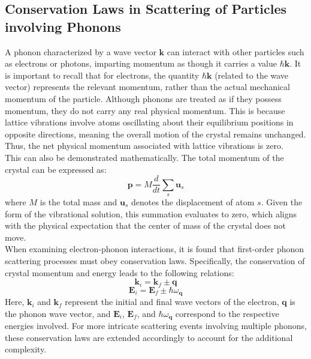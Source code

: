 \subsection{Conservation Laws in Scattering of Particles involving Phonons}
A phonon characterized by a wave vector $\mathbf{k}$ can interact with other particles such as electrons or photons, imparting momentum as though it carries a value $\hbar \mathbf{k}$. It is important to recall that for electrons, the quantity $\hbar \mathbf{k}$ (related to the wave vector) represents the relevant momentum, rather than the actual mechanical momentum of the particle. Although phonons are treated as if they possess momentum, they do not carry any real physical momentum. This is because lattice vibrations involve atoms oscillating about their equilibrium positions in opposite directions, meaning the overall motion of the crystal remains unchanged. Thus, the net physical momentum associated with lattice vibrations is zero.\\
This can also be demonstrated mathematically. The total momentum of the crystal can be expressed as:
\begin{equation}
	\mathbf{p} = M \frac{d}{dt} \sum_s \mathbf{u}_s
\end{equation}
where $M$ is the total mass and $\mathbf{u}_s$ denotes the displacement of atom $s$. Given the form of the vibrational solution, this summation evaluates to zero, which aligns with the physical expectation that the center of mass of the crystal does not move.\\
When examining electron-phonon interactions, it is found that first-order phonon scattering processes must obey conservation laws. Specifically, the conservation of crystal momentum and energy leads to the following relations:
\begin{equation}
	\mathbf{k}_i = \mathbf{k}_f \pm \mathbf{q}
\end{equation}
\begin{equation}
	\mathbf{E}_i = \mathbf{E}_f \pm \hbar \omega_{\mathbf{q}}
\end{equation}
Here, $\mathbf{k}_i$ and $\mathbf{k}_f$ represent the initial and final wave vectors of the electron, $\mathbf{q}$ is the phonon wave vector, and $\mathbf{E}_i$, $\mathbf{E}_f$, and $\hbar \omega_{\mathbf{q}}$ correspond to the respective energies involved. For more intricate scattering events involving multiple phonons, these conservation laws are extended accordingly to account for the additional complexity.

